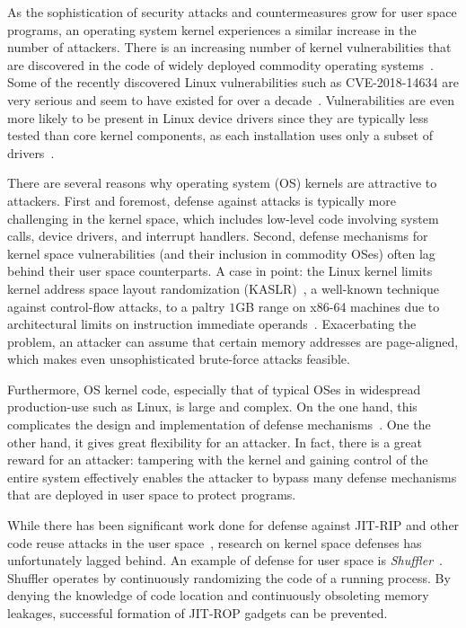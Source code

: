 As the sophistication of security attacks and countermeasures grow for user space programs, an operating system kernel experiences a similar increase in the number of attackers. There is an increasing number of kernel vulnerabilities that are discovered in the code of widely deployed commodity operating systems~\cite{LINUXVULN,WINDOWSVULN,MACOSVULN}. Some of the recently discovered Linux vulnerabilities such as CVE-2018-14634 are very serious and seem to have existed for over a decade~\cite{LINUXVULNDECADE}. Vulnerabilities are even more likely to be present in Linux device drivers since they are typically less tested than core kernel components, as each installation uses only a subset of drivers~\cite{cvedetails_kernel}.

There are several reasons why operating system (OS) kernels are attractive to attackers. First and foremost, defense against attacks is typically more challenging in the kernel space, which includes low-level code involving system calls, device drivers, and interrupt handlers. Second, defense mechanisms for kernel space vulnerabilities (and their inclusion in commodity OSes) often lag behind their user space counterparts. A case in point: the Linux kernel limits kernel address space layout randomization (KASLR)~\cite{KASLRLINUX},
a well-known technique against control-flow attacks, to a paltry $1$GB range on x86-64 machines due to architectural limits on instruction immediate operands~\cite{X86ABI,elixir_kernel_range:online}. Exacerbating the problem, an attacker can assume that certain memory addresses are page-aligned, which makes even unsophisticated brute-force attacks feasible.

Furthermore, OS kernel code, especially that of typical OSes in widespread production-use such as Linux, is large and complex. On the one hand, this complicates the design and implementation of defense mechanisms~\cite{ASRMINIX}. One the other hand, it gives
great flexibility for an attacker. In fact, there is a great reward
for an attacker: tampering with the kernel and gaining control of the entire system effectively enables the attacker to bypass many defense mechanisms that are deployed in user space to protect programs.

While there has been significant work done for defense against JIT-RIP and other code reuse attacks in the user space~\cite{SHUFFLER,MEMORYEXPLOIT,Wartell:2012:BSS:2382196.2382216,TASR,lu2016make,chen2017you}, research on kernel space defenses has unfortunately lagged behind. An example of defense for user space is \textit{Shuffler}~\cite{SHUFFLER}. Shuffler operates by continuously randomizing the code of a running process. By denying the knowledge of code location and continuously obsoleting memory leakages, successful formation of JIT-ROP gadgets can be prevented.

